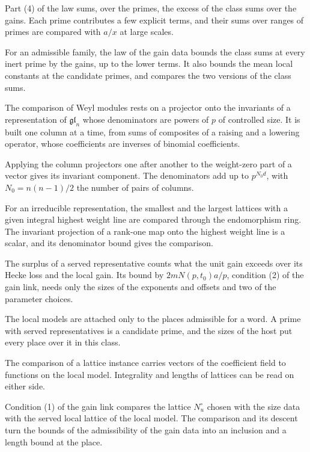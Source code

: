 Part (4) of the law sums, over the primes, the excess of the class sums over the gains. Each prime
contributes a few explicit terms, and their sums over ranges of primes are compared with
$a/x$ at large scales.

For an admissible family, the law of the gain data bounds the class sums at every inert prime by the
gains, up to the lower terms. It also bounds the mean local constants at the candidate primes, and
compares the two versions of the class sums.

The comparison of Weyl modules rests on a projector onto the invariants of a representation of
$\mathfrak{gl}_n$ whose denominators are powers of $p$ of controlled size. It is built one column at
a time, from sums of composites of a raising and a lowering operator, whose coefficients are
inverses of binomial coefficients.

Applying the column projectors one after another to the weight-zero part of a vector gives its
invariant component. The denominators add up to $p^{N_0d}$, with $N_0=n(n-1)/2$ the number of
pairs of columns.

For an irreducible representation, the smallest and the largest lattices with a given integral
highest weight line are compared through the endomorphism ring. The invariant projection of a
rank-one map onto the highest weight line is a scalar, and its denominator bound gives the
comparison.

The surplus of a served representative counts what the unit gain exceeds over its Hecke loss and the
local gain. Its bound by $2mN(p,t_0)a/p$, condition (2) of the gain link, needs only the sizes of the
exponents and offsets and two of the parameter choices.

The local models are attached only to the places admissible for a word. A prime with served
representatives is a candidate prime, and the sizes of the host put every place over it in this
class.

The comparison of a lattice instance carries vectors of the coefficient field to functions on the
local model. Integrality and lengths of lattices can be read on either side.

Condition (1) of the gain link compares the lattice $N^\circ_u$ chosen with the size data with the
served local lattice of the local model. The comparison and its descent turn the bounds of the
admissibility of the gain data into an inclusion and a length bound at the place.

